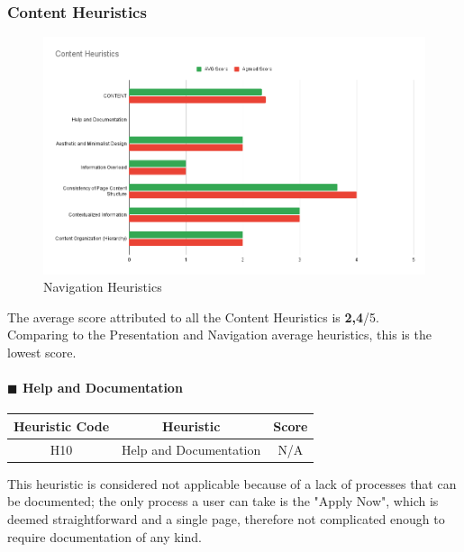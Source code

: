 \documentclass[11pt]{article} %
\begin{document}
\subsubsection{Content Heuristics}
\begin{figure}[H]
  \centering
  \includegraphics[width=\textwidth]{Images/Content Heuristics.png}
  \caption{Navigation Heuristics}
\end{figure}
The average score attributed to all the Content Heuristics is \textbf{2,4}/5. \\
Comparing to the Presentation and Navigation average heuristics, this is the lowest score.

\paragraph{$\blacksquare$ Help and Documentation}
\begin{center}
    \begin{tabular}{|c|c|c|} 
    \hline
    \textbf{Heuristic Code} & \textbf{Heuristic} & \textbf{Score}\\ 
    \hline
    H10 & Help and Documentation & N/A \\
    \hline
    \end{tabular}
\end{center}
This heuristic is considered not applicable because of a lack of processes that can be documented; the only process a user can take is the "Apply Now", which is deemed straightforward and a single page, therefore not complicated enough to require documentation of any kind.
\end{document}
